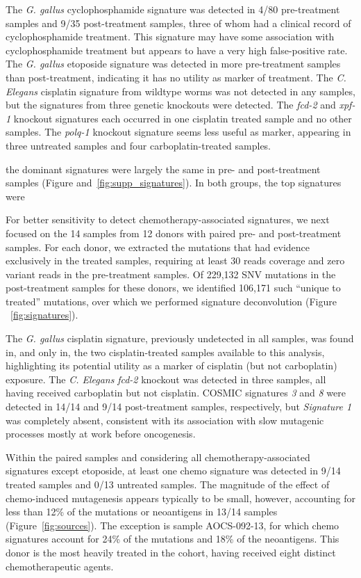 The \textit{G. gallus} cyclophosphamide signature was detected in 4/80 pre-treatment samples and 9/35 post-treatment samples, three of whom had a clinical record of cyclophosphamide treatment. This signature may have some association with cyclophosphamide treatment but appears to have a very high false-positive rate. The \textit{G. gallus} etoposide signature was detected in more pre-treatment samples than post-treatment, indicating it has no utility as marker of treatment. The \textit{C. Elegans} cisplatin signature from wildtype worms was not detected in any samples, but the signatures from three genetic knockouts were detected. The \textit{fcd-2} and \textit{xpf-1} knockout signatures each occurred in one cisplatin treated sample and no other samples. The \textit{polq-1} knockout signature seems less useful as marker, appearing in three untreated samples and four carboplatin-treated samples.

 the dominant signatures were largely the same in pre- and post-treatment samples (Figure and~\ref{fig:supp_signatures}). In both groups, the top signatures were 

For better sensitivity to detect chemotherapy-associated signatures, we next focused on the 14 samples from 12 donors with paired pre- and post-treatment samples. For each donor, we extracted the mutations that had evidence exclusively in the treated samples, requiring at least 30 reads coverage and zero variant reads in the pre-treatment samples. Of 229,132 SNV mutations in the post-treatment samples for these donors, we identified 106,171 such ``unique to treated'' mutations, over which we performed signature deconvolution (Figure ~\ref{fig:signatures}).

The \textit{G. gallus} cisplatin signature, previously undetected in all samples, was found in, and only in, the two cisplatin-treated samples available to this analysis, highlighting its potential utility as a marker of cisplatin (but not carboplatin) exposure. The \textit{C. Elegans} \textit{fcd-2} knockout was detected in three samples, all having received carboplatin but not cisplatin. COSMIC signatures \textit{3} and \textit{8} were detected in 14/14 and 9/14 post-treatment samples, respectively, but \textit{Signature 1} was completely absent, consistent with its association with slow mutagenic processes mostly at work before oncogenesis.

Within the paired samples and considering all chemotherapy-associated signatures except etoposide, at least one chemo signature was detected in 9/14 treated samples and 0/13 untreated samples. The magnitude of the effect of chemo-induced mutagenesis appears typically to be small, however, accounting for less than 12\% of the mutations or neoantigens in 13/14 samples (Figure~\ref{fig:sources}). The exception is sample AOCS-092-13, for which chemo signatures account for 24\% of the mutations and 18\% of the neoantigens. This donor is the most heavily treated in the cohort, having received eight distinct chemotherapeutic agents.
